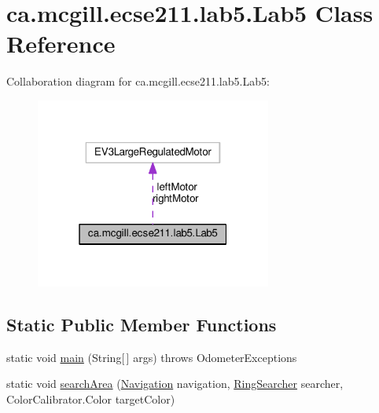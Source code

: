\hypertarget{classca_1_1mcgill_1_1ecse211_1_1lab5_1_1_lab5}{}\section{ca.\+mcgill.\+ecse211.\+lab5.\+Lab5 Class Reference}
\label{classca_1_1mcgill_1_1ecse211_1_1lab5_1_1_lab5}


Collaboration diagram for ca.\+mcgill.\+ecse211.\+lab5.\+Lab5\+:
\nopagebreak
\begin{figure}[H]
\begin{center}
\leavevmode
\includegraphics[width=220pt]{classca_1_1mcgill_1_1ecse211_1_1lab5_1_1_lab5__coll__graph}
\end{center}
\end{figure}
\subsection*{Static Public Member Functions}
\begin{DoxyCompactItemize}
\item 
static void \hyperlink{classca_1_1mcgill_1_1ecse211_1_1lab5_1_1_lab5_a82cca51f550ed0eb016bb2082d3fe755}{main} (String\mbox{[}$\,$\mbox{]} args)  throws Odometer\+Exceptions 
\item 
static void \hyperlink{classca_1_1mcgill_1_1ecse211_1_1lab5_1_1_lab5_a0e80ac0068ef1ab41cfb571b8c65845c}{search\+Area} (\hyperlink{classca_1_1mcgill_1_1ecse211_1_1lab5_1_1_navigation}{Navigation} navigation, \hyperlink{classca_1_1mcgill_1_1ecse211_1_1lab5_1_1_ring_searcher}{Ring\+Searcher} searcher, Color\+Calibrator.\+Color target\+Color)
\end{DoxyCompactItemize}
